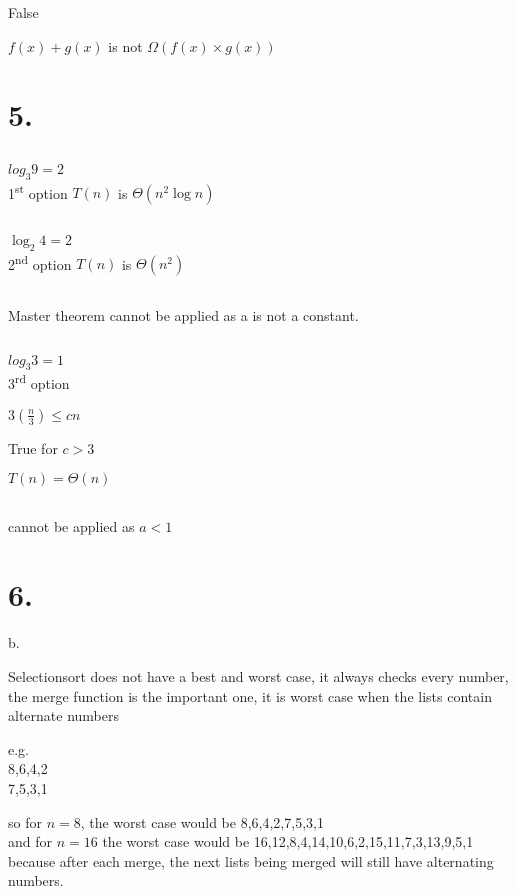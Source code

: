 \documentclass{article}
\begin{document}
False

\(f(x)+g(x)\) is not \(\Omega(f(x)\times g(x))\)

\section{5.}

    \subsection{}

\(log_3{9} = 2\)\\
1\textsuperscript{st} option
\(T(n) \) is \( \Theta(n^2\log{n})\)

    \subsection{}

\(\log_2{4} = 2\)\\
2\textsuperscript{nd} option
\(T(n)\) is \(\Theta (n^2)\)

    \subsection{}

Master theorem cannot be applied as a is not a constant.

    \subsection{}

\(log_3{3} = 1\)\\
3\textsuperscript{rd} option

\(3(\frac{n}{3}) \le cn \)

True for \(c > 3\)



\(T(n) = \Theta(n)\)

\subsection{}
cannot be applied as \(a < 1\)

\section{6.}
b.

Selectionsort does not have a best and worst case, it always checks every number, the merge function is the important one, it is worst case when the lists contain alternate numbers

e.g.\\
8,6,4,2\\7,5,3,1

so for \(n=8\), the worst case would be 8,6,4,2,7,5,3,1\\
and for \(n=16\) the worst case would be 16,12,8,4,14,10,6,2,15,11,7,3,13,9,5,1 because after each merge, the next lists being merged will still have alternating numbers.
\end{document}
